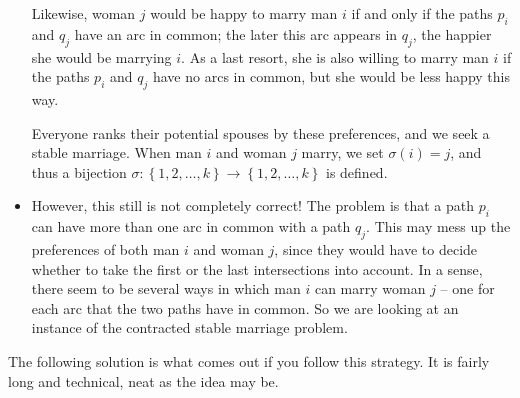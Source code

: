 \documentclass[numbers=enddot,12pt,final,onecolumn,notitlepage]{scrartcl}%
\theoremstyle{definition}
\newcommand{\set}[1]{\left\{ #1 \right\}}
\newcommand{\tup}[1]{\left( #1 \right)}
\begin{document}
\begin{itemize}
      Likewise, woman $j$ would be happy to marry man $i$ if and only
      if the paths $p_i$ and $q_j$ have an arc in common; the later
      this arc appears in $q_j$, the happier she would be marrying
      $i$.
      As a last resort, she is also willing to marry man $i$ if the
      paths $p_i$ and $q_j$ have no arcs in common, but she would be
      less happy this way. \par
      Everyone ranks their potential spouses by these preferences, and
      we seek a stable marriage.
      When man $i$ and woman $j$ marry, we set
      $\sigma \tup{i} = j$, and thus a bijection
      $\sigma : \set{1, 2, \ldots, k} \to \set{1, 2, \ldots, k}$
      is defined.
\item However, this still is not completely correct!
      The problem is that a path $p_i$ can have more than one arc in
      common with a path $q_j$.
      This may mess up the preferences of both man $i$ and woman $j$,
      since they would have to decide whether to take the first or the
      last intersections into account.
      In a sense, there seem to be several ways in which man $i$ can
      marry woman $j$ -- one for each arc that the two paths have in
      common.
      So we are looking at an instance of the contracted stable
      marriage problem.
\end{itemize}

The following solution is what comes out if you follow this strategy.
It is fairly long and technical, neat as the idea may be.
\end{document}

